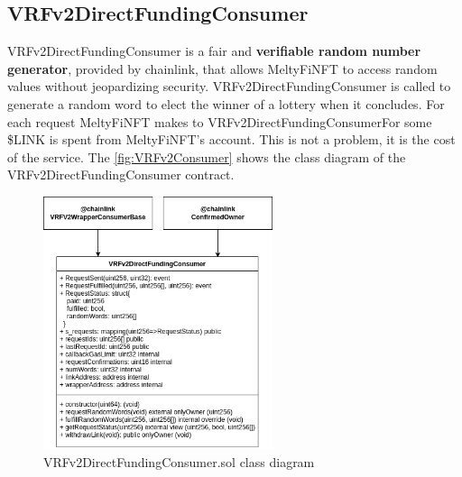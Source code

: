 \subsection{VRFv2DirectFundingConsumer}
VRFv2DirectFundingConsumer is a fair and \textbf{verifiable random number generator}, provided by chainlink, that allows MeltyFiNFT to access random values without jeopardizing security. VRFv2DirectFundingConsumer is called to generate a random word to elect the winner of a lottery when it concludes. For each request MeltyFiNFT makes to VRFv2DirectFundingConsumerFor some \$LINK is spent from MeltyFiNFT's account. This is not a problem, it is the cost of the service. The \autoref{fig:VRFv2Consumer} shows the class diagram of the VRFv2DirectFundingConsumer contract.
\begin{figure}[h]
    \centering
    \includegraphics[width=0.6\textwidth]{figures/VRFv2DirectFundingConsumer_class_diagram.png}
    \caption{VRFv2DirectFundingConsumer.sol class diagram}
    \label{fig:VRFv2Consumer}
\end{figure}

